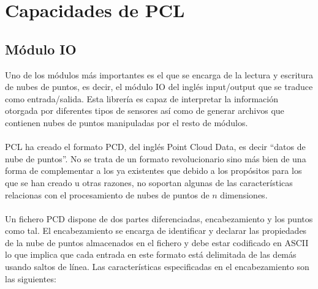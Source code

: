 \section{Capacidades de PCL}
\subsection{Módulo IO}
Uno de los módulos más importantes es el que se encarga de la lectura y escritura de nubes de puntos, es decir, el módulo IO del inglés input/output que se traduce como entrada/salida. Esta librería es capaz de interpretar la información otorgada por diferentes tipos de sensores así como de generar archivos que contienen nubes de puntos manipuladas por el resto de módulos.
\\
\\
PCL ha creado el formato PCD, del inglés Point Cloud Data, es decir ``datos de nube de puntos''. No se trata de un formato revolucionario sino más bien de una forma de complementar a los ya existentes que debido a los propósitos para los que se han creado u otras razones, no soportan algunas de las características relacionas con el procesamiento de nubes de puntos de $n$ dimensiones.
\\
\\
Un fichero PCD dispone de dos partes diferenciadas, encabezamiento y los puntos como tal. El encabezamiento se encarga de identificar y declarar las propiedades de la nube de puntos almacenados en el fichero y debe estar codificado en ASCII lo que implica que cada entrada en este formato está delimitada de las demás usando saltos de línea. Las características especificadas en el encabezamiento son las siguientes:
